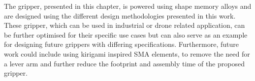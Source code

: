The gripper, presented in this chapter, is powered using shape memory alloys and are designed using the different design methodologies presented in this work. These gripper, which can be used in industrial or drone related application, can be further optimised for their specific use cases but can also serve as an example for designing future grippers with differing specifications. Furthermore, future work could include using kirigami inspired SMA elements, to remove the need for a lever arm and further reduce the footprint and assembly time of the proposed gripper.


%
